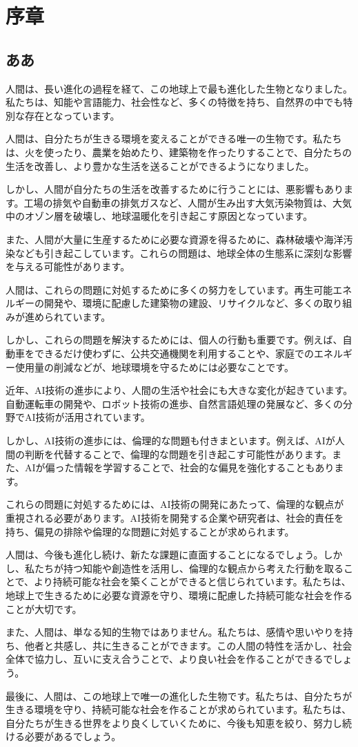 \chapter{序章}
\section{ああ}

    人間は、長い進化の過程を経て、この地球上で最も進化した生物となりました。私たちは、知能や言語能力、社会性など、多くの特徴を持ち、自然界の中でも特別な存在となっています。

    人間は、自分たちが生きる環境を変えることができる唯一の生物です。私たちは、火を使ったり、農業を始めたり、建築物を作ったりすることで、自分たちの生活を改善し、より豊かな生活を送ることができるようになりました。

    しかし、人間が自分たちの生活を改善するために行うことには、悪影響もあります。工場の排気や自動車の排気ガスなど、人間が生み出す大気汚染物質は、大気中のオゾン層を破壊し、地球温暖化を引き起こす原因となっています。

    また、人間が大量に生産するために必要な資源を得るために、森林破壊や海洋汚染なども引き起こしています。これらの問題は、地球全体の生態系に深刻な影響を与える可能性があります。

    人間は、これらの問題に対処するために多くの努力をしています。再生可能エネルギーの開発や、環境に配慮した建築物の建設、リサイクルなど、多くの取り組みが進められています。

    しかし、これらの問題を解決するためには、個人の行動も重要です。例えば、自動車をできるだけ使わずに、公共交通機関を利用することや、家庭でのエネルギー使用量の削減などが、地球環境を守るためには必要なことです。

    近年、AI技術の進歩により、人間の生活や社会にも大きな変化が起きています。自動運転車の開発や、ロボット技術の進歩、自然言語処理の発展など、多くの分野でAI技術が活用されています。

    しかし、AI技術の進歩には、倫理的な問題も付きまといます。例えば、AIが人間の判断を代替することで、倫理的な問題を引き起こす可能性があります。また、AIが偏った情報を学習することで、社会的な偏見を強化することもあります。

    これらの問題に対処するためには、AI技術の開発にあたって、倫理的な観点が重視される必要があります。AI技術を開発する企業や研究者は、社会的責任を持ち、偏見の排除や倫理的な問題に対処することが求められます。

    人間は、今後も進化し続け、新たな課題に直面することになるでしょう。しかし、私たちが持つ知能や創造性を活用し、倫理的な観点から考えた行動を取ることで、より持続可能な社会を築くことができると信じられています。私たちは、地球上で生きるために必要な資源を守り、環境に配慮した持続可能な社会を作ることが大切です。

    また、人間は、単なる知的生物ではありません。私たちは、感情や思いやりを持ち、他者と共感し、共に生きることができます。この人間の特性を活かし、社会全体で協力し、互いに支え合うことで、より良い社会を作ることができるでしょう。

    最後に、人間は、この地球上で唯一の進化した生物です。私たちは、自分たちが生きる環境を守り、持続可能な社会を作ることが求められています。私たちは、自分たちが生きる世界をより良くしていくために、今後も知恵を絞り、努力し続ける必要があるでしょう。